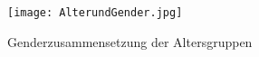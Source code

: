 \begin{figure}
\texttt{[image: AlterundGender.jpg]}
\caption{Genderzusammensetzung der Altersgruppen}
\label{pic:AlterundGender}
\end{figure}

